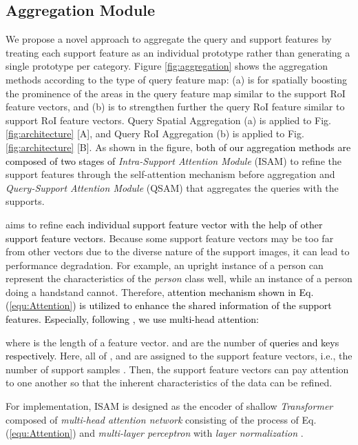 \documentclass[10pt,twocolumn,letterpaper]{article}
\newcommand{\nj}[1]{\textcolor{black}{#1}}
\begin{document}
\subsection{Aggregation Module}
\label{subsec:Aggregation}

We propose a novel approach to aggregate the query and support features by treating each support feature as an individual prototype rather than generating a single prototype per category. Figure \ref{fig:aggregation} shows the aggregation methods according to the type of query feature map: (a) is for spatially boosting the prominence of the areas in the query feature map similar to the support RoI feature vectors, and (b) is to strengthen further the query RoI feature similar to support RoI feature vectors. Query Spatial Aggregation (a) is applied to Fig. \ref{fig:architecture} [A], and Query RoI Aggregation (b) is applied to Fig. \ref{fig:architecture} [B].
As shown in the figure, \nj{both of our aggregation methods are composed of two stages of} \textit{Intra-Support Attention Module} (ISAM) to refine the support features through the self-attention mechanism before aggregation and \textit{Query-Support Attention Module} (QSAM) that aggregates the queries with the supports.


 aims to refine \nj{each individual support feature vector with the help of other support feature vectors}. Because some support feature vectors may be too far from other vectors due to the diverse nature of the support images, it can lead to performance degradation.
For example, an upright instance of a person can represent the characteristics of the \emph{person} class well, while an instance of a person doing a handstand cannot. 
Therefore, \nj{attention mechanism \cite{vaswani2017attention} shown in Eq. (\ref{equ:Attention}) is utilized to enhance the shared information of the support features. Especially, following  \cite{vaswani2017attention}, we use multi-head attention:}

where  is the length of a feature vector.  and  are the number of \nj{queries and keys respectively}. Here, all of ,  and  are assigned to the support feature vectors, i.e., the number of support samples . Then, the support feature vectors can pay attention to one another so that the inherent characteristics of the data can be refined.


For implementation, ISAM is designed as the encoder of shallow \emph{Transformer} \cite{vaswani2017attention, wang2019learning} composed of \emph{multi-head attention network} consisting of the process of Eq. (\ref{equ:Attention}) and \emph{multi-layer perceptron} with \emph{layer normalization} \cite{ba2016layer}.
\end{document}
